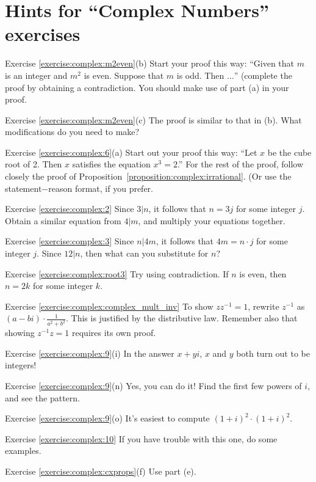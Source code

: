 \section{Hints for ``Complex Numbers'' exercises}\label{sec:complex:hints} 


\noindent Exercise \ref{exercise:complex:m2even}(b)
Start your proof this way: ``Given that $m$ is an integer and $m^2$ is even. Suppose that $m$ is odd. Then $\ldots$'' (complete the proof by obtaining a contradiction. You should make use of part (a) in your proof.

\noindent Exercise \ref{exercise:complex:m2even}(c)
The proof is similar to that in (b).  What modifications do you need to make?

\noindent Exercise \ref{exercise:complex:6}(a)
 Start out your proof this way: ``Let $x$ be the cube root of 2.  Then $x$ satisfies the equation $x^3 = 2$.'' For the rest of the proof, follow closely the proof of Proposition~\ref{proposition:complex:irrational}. (Or use the statement$-$reason format, if you prefer.

\noindent Exercise \ref{exercise:complex:2}
Since $3 | n$, it follows that $n=3j$ for some integer $j$. Obtain a similar equation from $4|m$, and multiply your equations together.


\noindent Exercise \ref{exercise:complex:3}
Since $n | 4m$, it follows that $4m=n\cdot j$ for some integer $j$. Since $12 | n$, then what can you substitute for $n$?

\noindent Exercise \ref{exercise:complex:root3}
Try using contradiction. If $n$ is even, then $n = 2k$ for some integer $k$.

\noindent Exercise \ref{exercise:complex:complex_mult_inv}
To show $zz^{-1}=1$, rewrite $z^{-1}$ as $(a-bi) \cdot \frac{1}{a^{2}+b^{2}}$. This is justified by the distributive law.  Remember also that showing $z^{-1}z=1$ requires its own proof.


\noindent Exercise \ref{exercise:complex:9}(i)
In the answer $x + yi$, $x$ and $y$ both turn out to be integers!

\noindent Exercise \ref{exercise:complex:9}(n)
Yes, you can do it! Find the first few powers of $i$, and see the pattern.

\noindent Exercise \ref{exercise:complex:9}(o)
It's easiest to compute $(1+i)^2 \cdot (1+i)^2$.

\noindent Exercise \ref{exercise:complex:10}
If you have trouble with this one, do some examples.

\noindent Exercise \ref{exercise:complex:cxprops}(f)
 Use part (e).


